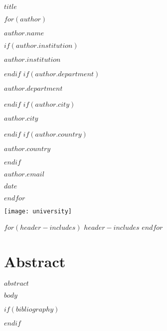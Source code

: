 \documentclass{article}
\begin{document}
\begin{titlepage}
\begin{center}
\vspace*{1cm}

\Huge
\textbf{$title$}

\vspace{0.8cm}

$for(author)$
\Large
\centerline{\textbf{$author.name$}}
$if(author.institution)$
\large
\centerline{$author.institution$}
$endif$
$if(author.department)$
\large
\centerline{$author.department$}
$endif$
$if(author.city)$
\large
\centerline{$author.city$}
$endif$
$if(author.country)$
\large
\centerline{$author.country$}
$endif$
\small
\centerline{$author.email$}
\centerline{$date$}
$endfor$

\vspace{0.8cm}

\texttt{[image: university]}

\end{center}
\end{titlepage}

$for(header-includes)$
$header-includes$
$endfor$


\section*{Abstract}
\thispagestyle{plain}
\begin{center}
    \large
    \vspace{0.9cm}
    $abstract$
\end{center}
\newpage
\tableofcontents

$body$

$if(bibliography)$
	
$endif$
\end{document}
